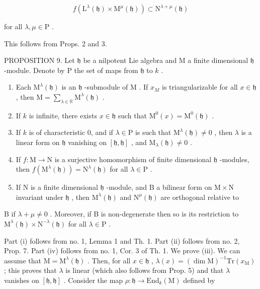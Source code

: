 \[
f (\mathrm{L} ^ {\lambda} (\mathfrak {h}) \times \mathrm{M} ^ {\mu} (\mathfrak {h})) \subset \mathrm{N} ^ {\lambda + \mu} (\mathfrak {h})
\]

for all \(\lambda, \mu \in \mathrm{P}\) .

This follows from Props. 2 and 3.

PROPOSITION 9. Let \(\mathfrak{h}\) be a nilpotent Lie algebra and M a finite dimensional \(\mathfrak{h}\) -module. Denote by P the set of maps from \(\mathfrak{h}\) to \(k\) .

\begin{enumerate}
\def\labelenumi{(\roman{enumi})}
\item
  Each \(\mathrm{M}^{\lambda}(\mathfrak{h})\) is an \(\mathfrak{h}\) -submodule of \(\mathrm{M}\) . If \(x_{M}\) is triangularizable for all \(x\in \mathfrak{h}\) , then \(\mathrm{M} = \sum_{\lambda \in \mathbb{R}}\mathrm{M}^{\lambda}(\mathfrak{h})\) .
\item
  If \(k\) is infinite, there exists \(x \in \mathfrak{h}\) such that \(\mathrm{M}^0(x) = \mathrm{M}^0(\mathfrak{h})\) .
\item
  If \(k\) is of characteristic 0, and if \(\lambda \in \mathrm{P}\) is such that \(\mathrm{M}^{\lambda}(\mathfrak{h}) \neq 0\) , then \(\lambda\) is a linear form on \(\mathfrak{h}\) vanishing on \([\mathfrak{h},\mathfrak{h}]\) , and \(\mathrm{M}_{\lambda}(\mathfrak{h}) \neq 0\) .
\item
  If \(f: \mathrm{M} \to \mathrm{N}\) is a surjective homomorphism of finite dimensional \(\mathfrak{h}\) -modules, then \(f(\mathrm{M}^{\lambda}(\mathfrak{h})) = \mathrm{N}^{\lambda}(\mathfrak{h})\) for all \(\lambda \in \mathrm{P}\) .
\item
  If \(\mathrm{N}\) is a finite dimensional \(\mathfrak{h}\) -module, and \(\mathrm{B}\) a bilinear form on \(\mathrm{M} \times \mathrm{N}\) invariant under \(\mathfrak{h}\) , then \(\mathrm{M}^{\lambda}(\mathfrak{h})\) and \(\mathrm{N}^{\mu}(\mathfrak{h})\) are orthogonal relative to
\end{enumerate}

B if \(\lambda + \mu \neq 0\) . Moreover, if B is non-degenerate then so is its restriction to \(\mathrm{M}^{\lambda}(\mathfrak{h}) \times \mathrm{N}^{-\lambda}(\mathfrak{h})\) for all \(\lambda \in \mathrm{P}\) .

Part (i) follows from no. 1, Lemma 1 and Th. 1. Part (ii) follows from no. 2, Prop. 7. Part (iv) follows from no. 1, Cor. 3 of Th. 1. We prove (iii). We can assume that \(\mathrm{M} = \mathrm{M}^{\lambda}(\mathfrak{h})\) . Then, for all \(x \in \mathfrak{h}\) , \(\lambda(x) = (\dim \mathrm{M})^{-1}\mathrm{Tr}(x_{\mathrm{M}})\) ; this proves that \(\lambda\) is linear (which also follows from Prop. 5) and that \(\lambda\) vanishes on \([\mathfrak{h},\mathfrak{h}]\) . Consider the map \(\rho : \mathfrak{h} \to \mathrm{End}_k(\mathrm{M})\) defined by

